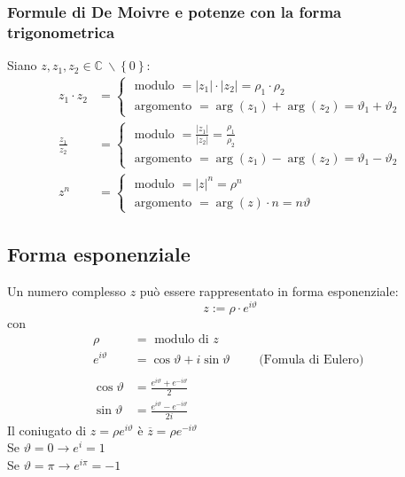 \documentclass[a4paper]{article}
\begin{document}
\subsubsection*{Formule di De Moivre e potenze con la forma trigonometrica}
Siano \(z, z_1, z_2 \in \mathbb{C} \  \backslash \left\{ 0 \right\}\):
\begin{align*}
	z_1 \cdot z_2 &= 
	\begin{cases}
		\text{ modulo } = \left| z_1 \right| \cdot \left| z_2 \right| = \rho_1 \cdot \rho_2 \\
		\text{ argomento } = \arg(z_1) + \arg(z_2) = \vartheta_1 + \vartheta_2
	\end{cases} \\
	\frac{z_1}{z_2} &= 
	\begin{cases}
		\text{ modulo } = \frac{\left| z_1 \right|}{\left| z_2 \right|} = \frac{\rho_1}{\rho_2}\\
		\text{ argomento } = \arg(z_1) - \arg(z_2) = \vartheta_1 - \vartheta_2
	\end{cases} \\
	z ^ n &= 
	\begin{cases}
		\text{ modulo } = \left| z \right| ^ n = \rho ^ n \\
		\text{ argomento } = \arg(z) \cdot n = n \vartheta
	\end{cases}
\end{align*}


\subsection{Forma esponenziale}
Un numero complesso \(z\) può essere rappresentato in forma esponenziale:
\[z := \rho \cdot e ^ {i \vartheta}\]
con
\begin{align*}
	\rho &= \text{ modulo di } z \\
	e^{i\vartheta} &= \cos \vartheta + i \sin \vartheta \qquad \text{ (Fomula di Eulero) } \\
	\\
	\cos \vartheta &= \frac{e ^ {i \vartheta} + e ^ {-i \vartheta}}{2} \\
	\sin \vartheta &= \frac{e ^ {i \vartheta} - e ^ {-i \vartheta}}{2i}
\end{align*}
Il coniugato di  \(z = \rho e ^ {i \vartheta}\) è \(\overline{z} = \rho e ^ {-i \vartheta}\) \\
Se \(\vartheta = 0 \to e ^ i = 1\) \\
Se \(\vartheta = \pi \to e ^ {i\pi} = -1\)
\end{document}

